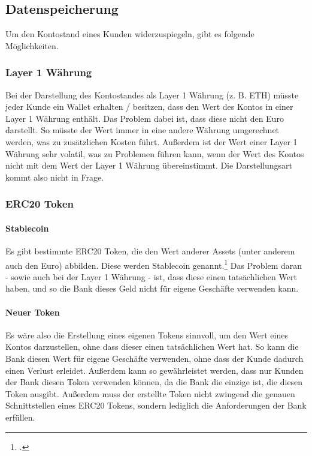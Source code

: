 \subsection{Datenspeicherung}
Um den Kontostand eines Kunden widerzuspiegeln, gibt es folgende Möglichkeiten.

\subsubsection{Layer 1 Währung}
Bei der Darstellung des Kontostandes als Layer 1 Währung (z. B. ETH) müsste jeder Kunde ein Wallet erhalten / besitzen, dass den Wert des Kontos in einer Layer 1 Währung enthält.
Das Problem dabei ist, dass diese nicht den Euro darstellt. 
So müsste der Wert immer in eine andere Währung umgerechnet werden, was zu zusätzlichen Kosten führt. Außerdem ist der Wert einer Layer 1 Währung sehr volatil, was zu Problemen führen kann, wenn der Wert des Kontos nicht mit dem Wert der Layer 1 Währung übereinstimmt.
Die Darstellungsart kommt also nicht in Frage.

\subsubsection{ERC20 Token}


\paragraph{Stablecoin}
Es gibt bestimmte ERC20 Token, die den Wert anderer Assets (unter anderem auch den Euro) abbilden. Diese werden Stablecoin genannt.\footcite[Vgl. hierzu und weiterführend][4]{q8}
Das Problem daran - sowie auch bei der Layer 1 Währung - ist, dass diese einen tatsächlichen Wert haben, und so die Bank dieses Geld nicht für eigene Geschäfte verwenden kann.

\paragraph{Neuer Token}
\label{datenspeicherung:neuer-token}
Es wäre also die Erstellung eines eigenen Tokens sinnvoll, um den Wert eines Kontos darzustellen, ohne dass dieser einen tatsächlichen Wert hat. So kann die Bank diesen Wert für eigene Geschäfte verwenden, ohne dass der Kunde dadurch einen Verlust erleidet. 
Außerdem kann so gewährleistet werden, dass nur Kunden der Bank diesen Token verwenden können, da die Bank die einzige ist, die diesen Token ausgibt.
Außerdem muss der erstellte Token nicht zwingend die genauen Schnittstellen eines ERC20 Tokens, sondern lediglich die Anforderungen der Bank erfüllen.

